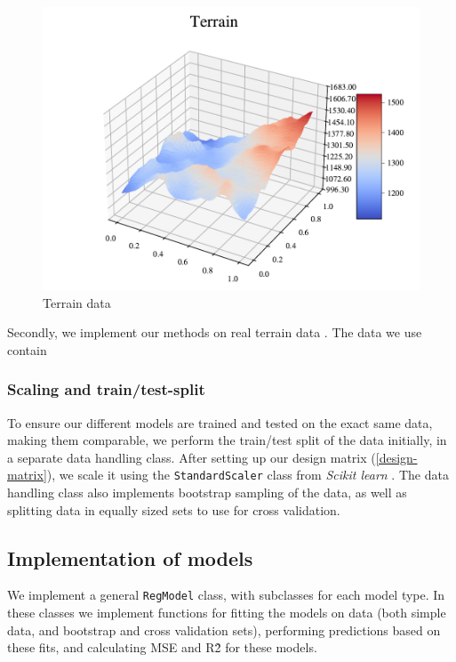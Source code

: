 \begin{figure}
    \centering
    \includegraphics[width=1\linewidth]{project_1_alt/figures/figures_in_report/terrain_41.pdf}
    \caption{Terrain data}
    \label{data:terrain}
\end{figure}

Secondly, we implement our methods on real terrain data \cite{mortengithub}. The data we use contain 


\subsubsection{Scaling and train/test-split}
To ensure our different models are trained and tested on the exact same data, making them comparable, we perform the train/test split of the data initially, in a separate data handling class.
After setting up our design matrix (\ref{design-matrix}), we scale it using the \texttt{StandardScaler} class from \textit{Scikit learn} \cite{sklearn}.
The data handling class also implements bootstrap sampling of the data, as well as splitting data in equally sized sets to use for cross validation.

\subsection{Implementation of models}
We implement a general \texttt{RegModel} class, with subclasses for each model type.
In these classes we implement functions for fitting the models on data (both simple data, and bootstrap and cross validation sets), performing predictions based on these fits, and calculating MSE and R\^2 for these models.

